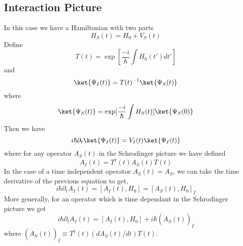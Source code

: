 \subsection{Interaction Picture}

In this case we have a Hamiltonian with two parts \begin{equation}
H_{S}(t)=H_{0}+V_{S}(t) \end{equation}
Define \begin{equation}
T(t)=\exp[\frac{-i}{\hbar}\int H_{0}(t')dt'] \end{equation}
and \begin{equation}
\ket{\Psi_{I}(t)}=T(t)^{-1}\ket{\Psi_{S}(t)} \end{equation}
where \begin{equation}
\ket{\Psi_{S}(t)}=\exp[\frac{-i}{\hbar}\int H_{S}(t)]\ket{\Psi_{S}(0)} \end{equation}
Then we have \begin{equation}
i\hbar\partial_{t}\ket{\Psi_{I}(t)}=V_{I}(t)\ket{\Psi_{I}(t)} \end{equation}
where for any operator $A_{S}(t)$ in the Schrodinger picture we have defined \begin{equation}
A_{I}(t)=T^{\dagger}(t)A_{S}(t)T(t) \end{equation}
In the case of a time independent operator $A_S(t)=A_S$, we can take the time derivative of the previous equation to get, \begin{equation}
i\hbar\partial_{t}A_{I}(t)=[A_{I}(t),H_{0}]=[A_{S}(t),H_{0}]_{I} \end{equation}
More generally, for an operator which is time dependant in the Schrodinger picture we get \begin{equation}
i\hbar\partial_t A_I(t) = [A_I(t),H_0]+i \hbar (\dot{A}_S(t))_I \end{equation}
where $(\dot{A}_S(t))_I \equiv T^{\dagger}(t) (dA_S(t)/dt)T(t)$.

